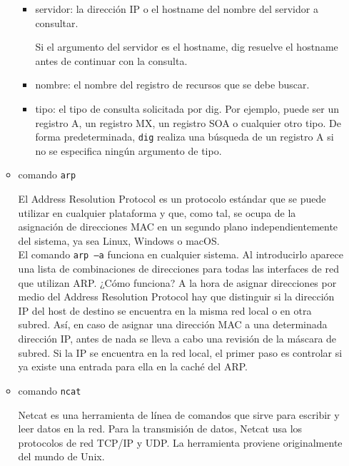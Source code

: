 \begin{itemize}
\begin{itemize}
        \begin{itemize}
            \item[] servidor: la dirección IP o el hostname del nombre del servidor a consultar.
            
            Si el argumento del servidor es el hostname, dig resuelve el hostname antes de continuar con la consulta.            

            \item[] nombre: el nombre del registro de recursos que se debe buscar.
            \item[] tipo: el tipo de consulta solicitada por dig. Por ejemplo, puede ser un registro A, 
            un registro MX, un registro SOA o cualquier otro tipo. De forma predeterminada, \texttt{dig} realiza 
            una búsqueda de un registro A si no se especifica ningún argumento de tipo.
        \end{itemize}

        \item comando \texttt{arp} \cite*{IONOSARP}
        
        El Address Resolution Protocol es un protocolo estándar que se puede utilizar en cualquier plataforma y que, 
        como tal, se ocupa de la asignación de direcciones MAC en un segundo plano independientemente del sistema, 
        ya sea Linux, Windows o macOS.\\

        El comando \texttt{arp –a} funciona en cualquier sistema. Al introducirlo aparece una lista de combinaciones
        de direcciones para todas las interfaces de red que utilizan ARP. ¿Cómo funciona? A la hora de 
        asignar direcciones por medio del Address Resolution Protocol hay que distinguir si la dirección IP 
        del host de destino se encuentra en la misma red local o en otra subred. Así, en caso de asignar una 
        dirección MAC a una determinada dirección IP, antes de nada se lleva a cabo una revisión de la 
        máscara de subred. Si la IP se encuentra en la red local, el primer paso es controlar si ya existe 
        una entrada para ella en la caché del ARP.


        \item comando \texttt{ncat} \cite*{IONOSNAT}
        
        Netcat es una herramienta de línea de comandos que sirve para escribir y leer datos en la red. Para 
        la transmisión de datos, Netcat usa los protocolos de red TCP/IP y UDP. La herramienta proviene 
        originalmente del mundo de Unix.


\end{itemize}
\end{itemize}
